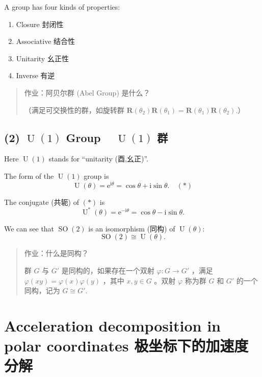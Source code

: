 A group has four kinds of properties:

\begin{enumerate}
\def\labelenumi{\arabic{enumi}.}
\setcounter{enumi}{1}
\item Closure 封闭性
\item Associative 结合性
\item Unitarity 幺正性
\item Inverse 有逆
\end{enumerate}

\begin{quote}
作业：阿贝尔群 (Abel Group) 是什么？

（满足可交换性的群，如旋转群
\(\mathbf R(\theta_2) \mathbf R(\theta_1) = \mathbf R(\theta_1) \mathbf R(\theta_2).\)）
\end{quote}

\subsection*{(2) \(\operatorname U(1)\) Group ~
\(\operatorname U(1)\)
群}\label{operatorname-u1-group-operatorname-u1-ux7fa4}

Here \(\operatorname U(1)\) stands for ``unitarity (酉,幺正)''.

The form of the \(\operatorname U(1)\) group is
\[\operatorname U(\theta) = \mathrm e^{\mathrm i \theta} = \cos \theta + \mathrm i \sin \theta. \quad (*)\]

The conjugate (共轭) of \((*)\) is
\[\operatorname U^*(\theta) = \mathrm e^{- \mathrm i \theta} = \cos \theta - \mathrm i \sin \theta.\]

We can see that \(\operatorname{SO}(2)\) is an isomorphism (同构) of
\(\operatorname U(\theta)\):
\[\operatorname{SO}(2) \cong \operatorname U(\theta).\]

\begin{quote}
作业：什么是同构？

群 \(G\) 与 \(G'\) 是同构的，如果存在一个双射 \(\varphi: G \to G'\)
，满足 \(\varphi(xy) = \varphi(x)\varphi(y)\) ，其中 \(x, y \in G\)
。双射 \(\varphi\) 称为群 \(G\) 和 \(G'\) 的一个同构，记为
\(G \cong G'.\)
\end{quote}

\section[Acceleration in polar coordinates 极坐标加速度]{Acceleration decomposition in polar coordinates 极坐标下的加速度分解}\label{acceleration-decomposition-in-polar-coordinates-ux6781ux5750ux6807ux4e0bux7684ux52a0ux901fux5ea6ux5206ux89e3}


